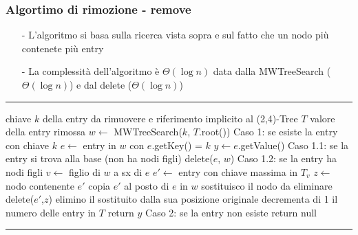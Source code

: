 \documentclass[a4paper]{article}
\makeatletter
\newenvironment{algo}[4]{
	\noindent\rule{\textwidth}{0.4pt}
	\begin{algorithmic}[1]
		\addtocounter{ALG@line}{-1}
		\Procedure{#1}{#2}
		\Require #3
		\Ensure #4
		\Statex }{
		\EndProcedure
	\end{algorithmic}
	\rule{\textwidth}{0.4pt}}
\makeatother
\begin{document}
\subsubsection*{Algortimo di rimozione - remove}
\begin{itemize}[topsep=3pt, itemsep=0pt]
	\item[-] L'algoritmo si basa sulla ricerca vista sopra e sul fatto che un nodo più contenete più entry
	\item[-] La complessità dell'algoritmo è \(\Theta(\log n)\) data dalla MWTreeSearch (\(\Theta(\log n)\)) e dal delete (\(\Theta(\log n)\))
\end{itemize}
\begin{algo}{remove}{$k$}{chiave $k$ della entry da rimuovere e riferimento implicito al (2,4)-Tree $T$}{valore della entry rimossa}
	\State $w \gets$ MWTreeSearch($k$, $T$.root())
	 \Comment Caso 1: se esiste la entry con chiave $k$
		\State $e \gets $ entry in $w$ con $e$.getKey() = $k$
		\State $y \gets e$.getValue()
		 \Comment Caso 1.1: se la entry si trova alla base (non ha nodi figli)
			\State delete($e$, $w$)
		\Else \Comment Caso 1.2: se la entry ha nodi figli
			\State $v \gets$ figlio di $w$ a sx di $e$
			\State $e' \gets$ entry con chiave massima in $T_v$
			\State $z \gets$ nodo contenente $e'$
			\State copia $e'$ al posto di $e$ in $w$ \Comment sostituisco il nodo da eliminare
			\State delete($e'$,$z$) \Comment elimino il sostituito dalla sua posizione originale
		\EndIf
		\State decrementa di 1 il numero delle entry in $T$
		\State return $y$
	\Else \Comment Caso 2: se la entry non esiste
		\State return null
	\EndIf
\end{algo}

\newpage
\end{document}
